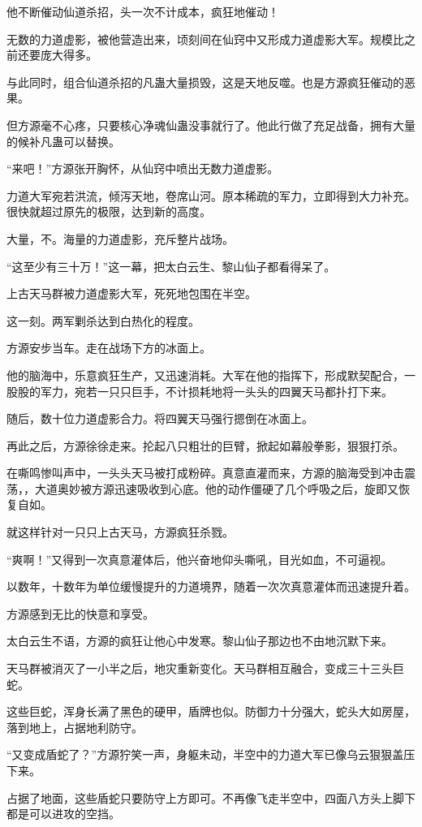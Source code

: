 \begin{this_body}
他不断催动仙道杀招，头一次不计成本，疯狂地催动！

无数的力道虚影，被他营造出来，顷刻间在仙窍中又形成力道虚影大军。规模比之前还要庞大得多。

与此同时，组合仙道杀招的凡蛊大量损毁，这是天地反噬。也是方源疯狂催动的恶果。

但方源毫不心疼，只要核心净魂仙蛊没事就行了。他此行做了充足战备，拥有大量的候补凡蛊可以替换。

“来吧！”方源张开胸怀，从仙窍中喷出无数力道虚影。

力道大军宛若洪流，倾泻天地，卷席山河。原本稀疏的军力，立即得到大力补充。很快就超过原先的极限，达到新的高度。

大量，不。海量的力道虚影，充斥整片战场。

“这至少有三十万！”这一幕，把太白云生、黎山仙子都看得呆了。

上古天马群被力道虚影大军，死死地包围在半空。

这一刻。两军剿杀达到白热化的程度。

方源安步当车。走在战场下方的冰面上。

他的脑海中，乐意疯狂生产，又迅速消耗。大军在他的指挥下，形成默契配合，一股股的军力，宛若一只只巨手，不计损耗地将一头头的四翼天马都扑打下来。

随后，数十位力道虚影合力。将四翼天马强行摁倒在冰面上。

再此之后，方源徐徐走来。抡起八只粗壮的巨臂，掀起如幕般拳影，狠狠打杀。

在嘶鸣惨叫声中，一头头天马被打成粉碎。真意直灌而来，方源的脑海受到冲击震荡，，大道奥妙被方源迅速吸收到心底。他的动作僵硬了几个呼吸之后，旋即又恢复自如。

就这样针对一只只上古天马，方源疯狂杀戮。

“爽啊！”又得到一次真意灌体后，他兴奋地仰头嘶吼，目光如血，不可逼视。

以数年，十数年为单位缓慢提升的力道境界，随着一次次真意灌体而迅速提升着。

方源感到无比的快意和享受。

太白云生不语，方源的疯狂让他心中发寒。黎山仙子那边也不由地沉默下来。

天马群被消灭了一小半之后，地灾重新变化。天马群相互融合，变成三十三头巨蛇。

这些巨蛇，浑身长满了黑色的硬甲，盾牌也似。防御力十分强大，蛇头大如房屋，落到地上，占据地利防守。

“又变成盾蛇了？”方源狞笑一声，身躯未动，半空中的力道大军已像乌云狠狠盖压下来。

占据了地面，这些盾蛇只要防守上方即可。不再像飞走半空中，四面八方头上脚下都是可以进攻的空挡。


\end{this_body}
